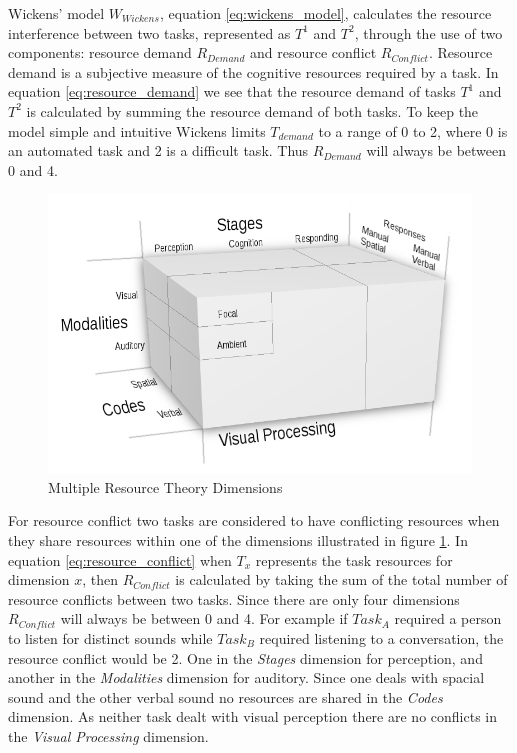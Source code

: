 Wickens' model $W_{Wickens}$, equation \ref{eq:wickens_model}, calculates the resource interference between two tasks, represented as $T^{1}$ and $T^{2}$, through the use of two components: resource demand $R_{Demand}$ and resource conflict $R_{Conflict}$.  Resource demand is a subjective measure of the cognitive resources required by a task.  In equation \ref{eq:resource_demand} we see that the resource demand of tasks $T^{1}$ and $T^{2}$ is calculated by summing the resource demand of both tasks.  To keep the model simple and intuitive Wickens limits $T_{demand}$ to a range of 0 to 2, where 0 is an automated task and 2 is a difficult task.  Thus $R_{Demand}$ will always be between 0 and 4.


\begin{figure}[h]
\begin{center}
\includegraphics[width=6in]{multipleresourcetheory.png}
\caption{Multiple Resource Theory Dimensions~\cite{wickens2002multiple}}
\label{fig:multipleresourcetheory}
\end{center}
\end{figure}

For resource conflict two tasks are considered to have conflicting resources when they share resources within one of the dimensions illustrated in figure \ref{fig:multipleresourcetheory}.  In equation \ref{eq:resource_conflict} when $T_{x}$ represents the task resources for dimension $x$, then $R_{Conflict}$ is calculated by taking the sum of the total number of resource conflicts between two tasks.  Since there are only four dimensions $R_{Conflict}$ will always be between 0 and 4.  For example if $Task_{A}$ required a person to listen for distinct sounds while $Task_{B}$ required listening to a conversation, the resource conflict would be 2.  One in the {\em Stages} dimension for perception, and another in the {\em Modalities} dimension for auditory.  Since one deals with spacial sound and the other verbal sound no resources are shared in the {\em Codes} dimension.  As neither task dealt with visual perception there are no conflicts in the {\em Visual Processing} dimension.


